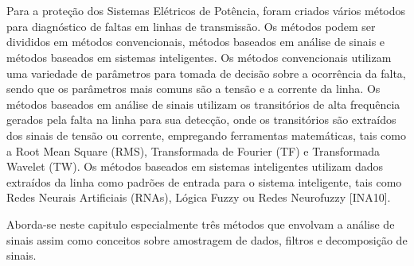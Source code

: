 \chapter{\captres}\label{analise}
\par 
Para a proteção dos Sistemas Elétricos de Potência, foram criados vários métodos para diagnóstico de faltas em linhas de transmissão.
Os métodos podem ser divididos em métodos convencionais, métodos baseados em análise de sinais e métodos baseados em sistemas inteligentes.
Os métodos convencionais utilizam uma variedade de parâmetros para tomada de decisão sobre a ocorrência da falta, sendo que os parâmetros mais comuns são a tensão e a corrente da linha.
Os métodos baseados em análise de sinais utilizam os transitórios de alta frequência gerados pela falta na linha para sua detecção, onde os transitórios são extraídos dos sinais de tensão ou corrente, empregando ferramentas matemáticas, tais como a Root Mean Square (RMS), Transformada de Fourier (TF) e Transformada Wavelet (TW).
Os métodos baseados em sistemas inteligentes utilizam dados extraídos da linha como padrões de entrada para o sistema inteligente, tais como Redes Neurais Artificiais (RNAs), Lógica Fuzzy ou Redes Neurofuzzy [INA10]. 
\par
Aborda-se neste capitulo especialmente três métodos que envolvam a análise de sinais assim como conceitos sobre amostragem de dados, filtros e decomposição de sinais.
